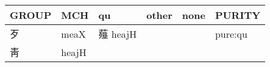 \documentclass[14pt,a4paper]{scrartcl}
\begin{document}
\begin{longtable}[c]{@{}llllll@{}}
\toprule
\begin{minipage}[b]{0.14\columnwidth}\raggedright\strut
GROUP
\strut\end{minipage} &
\begin{minipage}[b]{0.14\columnwidth}\raggedright\strut
MCH
\strut\end{minipage} &
\begin{minipage}[b]{0.14\columnwidth}\raggedright\strut
qu
\strut\end{minipage} &
\begin{minipage}[b]{0.14\columnwidth}\raggedright\strut
other
\strut\end{minipage} &
\begin{minipage}[b]{0.14\columnwidth}\raggedright\strut
none
\strut\end{minipage} &
\begin{minipage}[b]{0.14\columnwidth}\raggedright\strut
PURITY
\strut\end{minipage}\tabularnewline
\midrule
\endhead
\begin{minipage}[t]{0.14\columnwidth}\raggedright\strut
歹
\strut\end{minipage} &
\begin{minipage}[t]{0.14\columnwidth}\raggedright\strut
meaX
\strut\end{minipage} &
\begin{minipage}[t]{0.14\columnwidth}\raggedright\strut
薤 heajH
\strut\end{minipage} &
\begin{minipage}[t]{0.14\columnwidth}\raggedright\strut
\strut\end{minipage} &
\begin{minipage}[t]{0.14\columnwidth}\raggedright\strut
\strut\end{minipage} &
\begin{minipage}[t]{0.14\columnwidth}\raggedright\strut
pure:qu
\strut\end{minipage}\tabularnewline
\begin{minipage}[t]{0.14\columnwidth}\raggedright\strut
靑
\strut\end{minipage} &
\begin{minipage}[t]{0.14\columnwidth}\raggedright\strut
heajH
\strut\end{minipage} &
\begin{minipage}[t]{0.14\columnwidth}\raggedright\strut
\strut\end{minipage} &
\begin{minipage}[t]{0.14\columnwidth}\raggedright\strut

\end{minipage}
\end{longtable}
\end{document}

